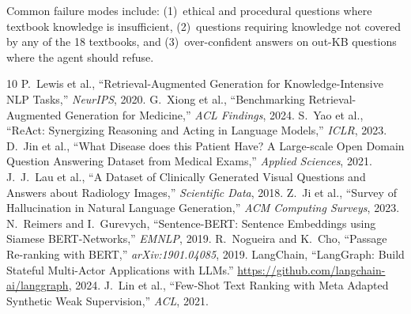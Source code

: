 \documentclass[10pt,twocolumn,letterpaper]{article}
\begin{document}
Common failure modes include: (1)~ethical and procedural questions where textbook knowledge is insufficient, (2)~questions requiring knowledge not covered by any of the 18 textbooks, and (3)~over-confident answers on out-KB questions where the agent should refuse.

{\small

\begin{thebibliography}{10}
\setlength{\itemsep}{0pt}
\setlength{\parsep}{0pt}
 P.~Lewis et al., ``Retrieval-Augmented Generation for Knowledge-Intensive NLP Tasks,'' \textit{NeurIPS}, 2020.
 G.~Xiong et al., ``Benchmarking Retrieval-Augmented Generation for Medicine,'' \textit{ACL Findings}, 2024.
 S.~Yao et al., ``ReAct: Synergizing Reasoning and Acting in Language Models,'' \textit{ICLR}, 2023.
 D.~Jin et al., ``What Disease does this Patient Have? A Large-scale Open Domain Question Answering Dataset from Medical Exams,'' \textit{Applied Sciences}, 2021.
 J.~J.~Lau et al., ``A Dataset of Clinically Generated Visual Questions and Answers about Radiology Images,'' \textit{Scientific Data}, 2018.
 Z.~Ji et al., ``Survey of Hallucination in Natural Language Generation,'' \textit{ACM Computing Surveys}, 2023.
 N.~Reimers and I.~Gurevych, ``Sentence-BERT: Sentence Embeddings using Siamese BERT-Networks,'' \textit{EMNLP}, 2019.
 R.~Nogueira and K.~Cho, ``Passage Re-ranking with BERT,'' \textit{arXiv:1901.04085}, 2019.
 LangChain, ``LangGraph: Build Stateful Multi-Actor Applications with LLMs.'' \url{https://github.com/langchain-ai/langgraph}, 2024.
 J.~Lin et al., ``Few-Shot Text Ranking with Meta Adapted Synthetic Weak Supervision,'' \textit{ACL}, 2021.
\end{thebibliography}
}
\end{document}
